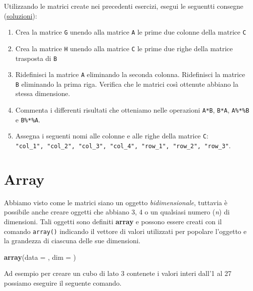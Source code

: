 \documentclass[
]{book}
\newenvironment{Shaded}{\begin{snugshade}}{\end{snugshade}}
\newcommand{\DataTypeTok}[1]{\textcolor[rgb]{0.13,0.29,0.53}{#1}}
\newcommand{\KeywordTok}[1]{\textcolor[rgb]{0.13,0.29,0.53}{\textbf{#1}}}
\newcommand{\NormalTok}[1]{#1}
\providecommand{\tightlist}{%
  \setlength{\itemsep}{0pt}\setlength{\parskip}{0pt}}
\begin{document}
Utilizzando le matrici create nei precedenti esercizi, esegui le seguentti consegne (\href{https://github.com/psicostat/Introduction2R/blob/master/exercises/chapter-09.R}{soluzioni}):

\begin{enumerate}
\def\labelenumi{\arabic{enumi}.}
\tightlist
\item
  Crea la matrice \texttt{G} unendo alla matrice \texttt{A} le prime due colonne della matrice \texttt{C}
\item
  Crea la matrice \texttt{H} unendo alla matrice \texttt{C} le prime due righe della matrice trasposta di \texttt{B}
\item
  Ridefinisci la matrice \texttt{A} eliminando la seconda colonna. Ridefinisci la matrice \texttt{B} eliminando la prima riga. Verifica che le matrici così ottenute abbiano la stessa dimensione.
\item
  Commenta i differenti risultati che otteniamo nelle operazioni \texttt{A*B}, \texttt{B*A}, \texttt{A\%*\%B} e \texttt{B\%*\%A}.
\item
  Assegna i seguenti nomi alle colonne e alle righe della matrice \texttt{C}: \texttt{"col\_1",\ "col\_2",\ "col\_3",\ "col\_4",\ "row\_1",\ "row\_2",\ "row\_3"}.
\end{enumerate}

\hypertarget{array}{%
\section{Array}\label{array}}

Abbiamo visto come le matrici siano un oggetto \emph{bidimensionale}, tuttavia è possibile anche creare oggetti che abbiano 3, 4 o un qualsiasi numero (\emph{n}) di dimensioni. Tali oggetti sono definiti \textbf{array} e possono essere creati con il comando \texttt{array()} indicando il vettore di valori utilizzati per popolare l'oggetto e la grandezza di ciascuna delle sue dimensioni.

\begin{Shaded}
\begin{Highlighting}[]
\KeywordTok{array}\NormalTok{(}\DataTypeTok{data =}\NormalTok{ , }\DataTypeTok{dim =}\NormalTok{ )}
\end{Highlighting}
\end{Shaded}

Ad esempio per creare un cubo di lato 3 contenete i valori interi dall'1 al 27 possiamo eseguire il seguente comando.
\end{document}
